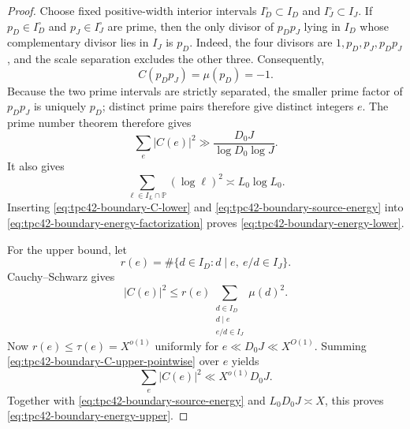 \begin{proof}
Choose fixed positive-width interior intervals
\(I_D^\circ\subset I_D\) and \(I_J^\circ\subset I_J\).  If
\(p_D\in I_D^\circ\) and \(p_J\in I_J^\circ\) are prime, then the only
divisor of \(p_Dp_J\) lying in \(I_D\) whose complementary divisor lies
in \(I_J\) is \(p_D\).  Indeed, the four divisors are
\(1,p_D,p_J,p_Dp_J\), and the scale separation excludes the other three.
Consequently,
\begin{equation}
 C(p_Dp_J)=\mu(p_D)=-1.
 \label{eq:tpc42-boundary-prime-pair-C}
\end{equation}
Because the two prime intervals are strictly separated, the smaller
prime factor of \(p_Dp_J\) is uniquely \(p_D\); distinct prime pairs
therefore give distinct integers \(e\).
The prime number theorem therefore gives
\begin{equation}
 \sum_e|C(e)|^2
 \gg
 \frac{D_0J}{\log D_0\log J}.
 \label{eq:tpc42-boundary-C-lower}
\end{equation}
It also gives
\begin{equation}
 \sum_{\ell\in I_L\cap\mathbb P}(\log\ell)^2
 \asymp L_0\log L_0.
 \label{eq:tpc42-boundary-source-energy}
\end{equation}
Inserting \eqref{eq:tpc42-boundary-C-lower} and
\eqref{eq:tpc42-boundary-source-energy} into
\eqref{eq:tpc42-boundary-energy-factorization} proves
\eqref{eq:tpc42-boundary-energy-lower}.

For the upper bound, let
\begin{equation}
 r(e)=\#\{d\in I_D:d\mid e,\ e/d\in I_J\}.
 \label{eq:tpc42-boundary-representation-count}
\end{equation}
Cauchy--Schwarz gives
\begin{equation}
 |C(e)|^2
 \le r(e)
 \sum_{\substack{d\in I_D\\d\mid e\\e/d\in I_J}}\mu(d)^2.
 \label{eq:tpc42-boundary-C-upper-pointwise}
\end{equation}
Now \(r(e)\le\tau(e)=X^{o(1)}\) uniformly for
\(e\ll D_0J\ll X^{O(1)}\).  Summing
\eqref{eq:tpc42-boundary-C-upper-pointwise} over \(e\) yields
\begin{equation}
 \sum_e|C(e)|^2\ll X^{o(1)}D_0J.
 \label{eq:tpc42-boundary-C-upper}
\end{equation}
Together with \eqref{eq:tpc42-boundary-source-energy} and
\(L_0D_0J\asymp X\), this proves
\eqref{eq:tpc42-boundary-energy-upper}.
\end{proof}

